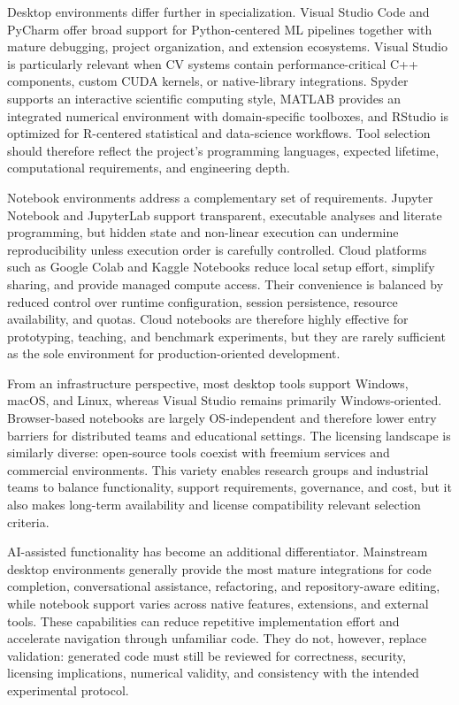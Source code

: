 \documentclass{article}
\newcounter{entry}[section]
\begin{document}
Desktop environments differ further in specialization. Visual Studio Code and PyCharm offer broad support for Python-centered ML pipelines together with mature debugging, project organization, and extension ecosystems. Visual Studio is particularly relevant when CV systems contain performance-critical C++ components, custom CUDA kernels, or native-library integrations. Spyder supports an interactive scientific computing style, MATLAB provides an integrated numerical environment with domain-specific toolboxes, and RStudio is optimized for R-centered statistical and data-science workflows. Tool selection should therefore reflect the project's programming languages, expected lifetime, computational requirements, and engineering depth.

Notebook environments address a complementary set of requirements. Jupyter Notebook and JupyterLab support transparent, executable analyses and literate programming, but hidden state and non-linear execution can undermine reproducibility unless execution order is carefully controlled. Cloud platforms such as Google Colab and Kaggle Notebooks reduce local setup effort, simplify sharing, and provide managed compute access. Their convenience is balanced by reduced control over runtime configuration, session persistence, resource availability, and quotas. Cloud notebooks are therefore highly effective for prototyping, teaching, and benchmark experiments, but they are rarely sufficient as the sole environment for production-oriented development.

From an infrastructure perspective, most desktop tools support Windows, macOS, and Linux, whereas Visual Studio remains primarily Windows-oriented. Browser-based notebooks are largely OS-independent and therefore lower entry barriers for distributed teams and educational settings. The licensing landscape is similarly diverse: open-source tools coexist with freemium services and commercial environments. This variety enables research groups and industrial teams to balance functionality, support requirements, governance, and cost, but it also makes long-term availability and license compatibility relevant selection criteria.

AI-assisted functionality has become an additional differentiator. Mainstream desktop environments generally provide the most mature integrations for code completion, conversational assistance, refactoring, and repository-aware editing, while notebook support varies across native features, extensions, and external tools. These capabilities can reduce repetitive implementation effort and accelerate navigation through unfamiliar code. They do not, however, replace validation: generated code must still be reviewed for correctness, security, licensing implications, numerical validity, and consistency with the intended experimental protocol.
\end{document}
